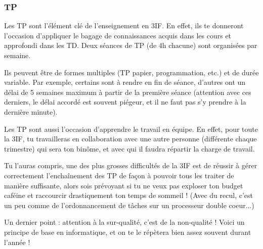 \subsubsection{TP}
Les TP sont l'élément clé de l'enseignement en 3IF. En effet, ils
te donneront l'occasion d'appliquer le bagage de connaissances acquis dans
les cours et approfondi dans les TD. Deux séances de TP (de 4h chacune) sont
organisées par semaine.

\vspace{1em}

Ils peuvent être de formes multiples (TP papier, programmation, etc.)
    et de durée variable. Par exemple, certains sont à rendre en fin de séance,
    d'autres ont un délai de 5 semaines maximum à partir de la première séance (attention
	avec ces derniers, le délai accordé est souvent piégeur, et il ne faut pas s'y prendre à la dernière minute).
    
\vspace{1em}

Les TP sont aussi l'occasion d'apprendre le travail en équipe. En effet, pour toute la
3IF, tu travailleras en collaboration avec une autre personne (différente chaque trimestre) qui
sera ton binôme, et avec qui il faudra répartir la charge de travail.

\vspace{1em}

Tu l'auras compris, une des plus grosses difficultés de la 3IF est de réussir
à gérer correctement l'enchaînement des TP de façon à pouvoir tous les
traiter de manière suffisante, alors sois prévoyant si tu ne veux pas
exploser ton budget caféine et raccourcir drastiquement ton temps de sommeil ! (Avec
du recul, c'est un peu comme de l'ordonnancement de tâches sur un processeur double coeur...) 

\vspace{1em}

Un dernier point : attention à la sur-qualité, c'est de la non-qualité ! Voici un principe de
base en informatique, et on te le répètera bien assez souvent durant l'année !
